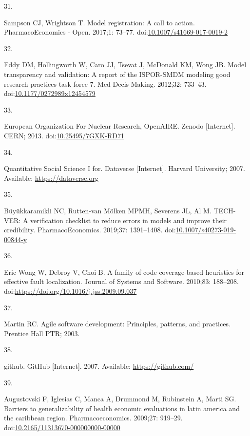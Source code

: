 \documentclass[
]{article}
\newlength{\cslhangindent}
\newlength{\csllabelwidth}
\newlength{\cslentryspacingunit} %
\newenvironment{CSLReferences}[2] %
 {%
  \setlength{\parindent}{0pt}
  \ifodd #1
  \let\oldpar\par
  \def\par{\hangindent=\cslhangindent\oldpar}
  \fi
  \setlength{\parskip}{#2\cslentryspacingunit}
 }%
 {}
\newcommand{\CSLLeftMargin}[1]{\parbox[t]{\csllabelwidth}{#1}}
\newcommand{\CSLRightInline}[1]{\parbox[t]{\linewidth - \csllabelwidth}{#1}\break}
\begin{document}
\begin{CSLReferences}{0}{0}
\leavevmode{}%
\CSLLeftMargin{31. }%
\CSLRightInline{Sampson CJ, Wrightson T. Model registration: A call to action. PharmacoEconomics - Open. 2017;1: 73--77. doi:\href{https://doi.org/10.1007/s41669-017-0019-2}{10.1007/s41669-017-0019-2}}

\leavevmode{}%
\CSLLeftMargin{32. }%
\CSLRightInline{Eddy DM, Hollingworth W, Caro JJ, Tsevat J, McDonald KM, Wong JB. Model transparency and validation: A report of the ISPOR-SMDM modeling good research practices task force-7. Med Decis Making. 2012;32: 733--43. doi:\href{https://doi.org/10.1177/0272989x12454579}{10.1177/0272989x12454579}}

\leavevmode{}%
\CSLLeftMargin{33. }%
\CSLRightInline{European Organization For Nuclear Research, OpenAIRE. Zenodo {[}Internet{]}. CERN; 2013. doi:\href{https://doi.org/10.25495/7GXK-RD71}{10.25495/7GXK-RD71}}

\leavevmode{}%
\CSLLeftMargin{34. }%
\CSLRightInline{Quantitative Social Science I for. Dataverse {[}Internet{]}. Harvard University; 2007. Available: \url{https://dataverse.org}}

\leavevmode{}%
\CSLLeftMargin{35. }%
\CSLRightInline{Büyükkaramikli NC, Rutten-van Mölken MPMH, Severens JL, Al M. TECH-VER: A verification checklist to reduce errors in models and improve their credibility. PharmacoEconomics. 2019;37: 1391--1408. doi:\href{https://doi.org/10.1007/s40273-019-00844-y}{10.1007/s40273-019-00844-y}}

\leavevmode{}%
\CSLLeftMargin{36. }%
\CSLRightInline{Eric Wong W, Debroy V, Choi B. A family of code coverage-based heuristics for effective fault localization. Journal of Systems and Software. 2010;83: 188--208. doi:\url{https://doi.org/10.1016/j.jss.2009.09.037}}

\leavevmode{}%
\CSLLeftMargin{37. }%
\CSLRightInline{Martin RC. Agile software development: Principles, patterns, and practices. Prentice Hall PTR; 2003. }

\leavevmode{}%
\CSLLeftMargin{38. }%
\CSLRightInline{github. GitHub {[}Internet{]}. 2007. Available: \url{https://github.com/}}

\leavevmode{}%
\CSLLeftMargin{39. }%
\CSLRightInline{Augustovski F, Iglesias C, Manca A, Drummond M, Rubinstein A, Marti SG. Barriers to generalizability of health economic evaluations in latin america and the caribbean region. Pharmacoeconomics. 2009;27: 919--29. doi:\href{https://doi.org/10.2165/11313670-000000000-00000}{10.2165/11313670-000000000-00000}}


\end{CSLReferences}
\end{document}

